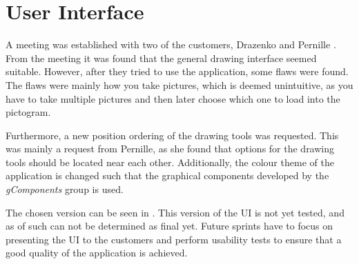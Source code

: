 \section{User Interface}
A meeting was established with two of the customers, Drazenko and Pernille \citep{misc:drazenko, misc:pernille}.
From the meeting it was found that the general drawing interface seemed suitable.
However, after they tried to use the application, some flaws were found.
The flaws were mainly how you take pictures, which is deemed unintuitive, as you have to take multiple pictures and then later choose which one to load into the pictogram.

Furthermore, a new position ordering of the drawing tools was requested.
This was mainly a request from Pernille, as she found that options for the drawing tools should be located near each other.
Additionally, the colour theme of the application is changed such that the graphical components developed by the \textit{gComponents} group is used.

The chosen version can be seen in \appref{}.
This version of the UI is not yet tested, and as of such can not be determined as final yet.
Future sprints have to focus on presenting the UI to the customers and perform usability tests to ensure that a good quality of the application is achieved.


%